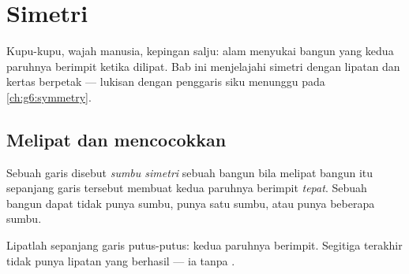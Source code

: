 \chapter{Simetri}\label{ch:g4:symmetry}

Kupu-kupu, wajah manusia, kepingan salju: alam menyukai bangun yang
kedua paruhnya berimpit ketika dilipat. Bab ini menjelajahi simetri
dengan lipatan dan kertas berpetak --- lukisan dengan penggaris siku
menunggu pada \cref{ch:g6:symmetry}.

\section{Melipat dan mencocokkan}

\begin{definition}\label{def:g4:symmetry:def}
Sebuah garis disebut \emph{sumbu simetri}
sebuah bangun bila melipat bangun itu sepanjang garis tersebut
membuat kedua paruhnya berimpit \emph{tepat}. Sebuah bangun dapat
tidak punya sumbu, punya satu sumbu, atau punya beberapa sumbu.
\end{definition}

\begin{omfigure}

{\small Lipatlah sepanjang garis putus-putus: kedua paruhnya
berimpit. Segitiga terakhir tidak punya lipatan yang berhasil --- ia tanpa .}
\end{omfigure}

